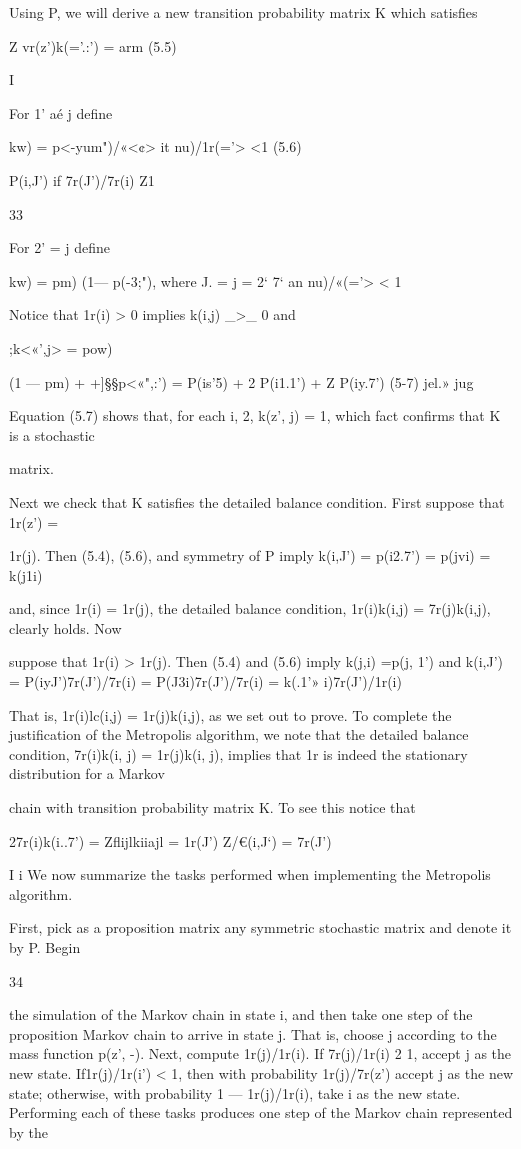 Using P, we will derive a new transition probability matrix K which satisﬁes

Z vr(z')k(='.:') = arm (5.5)

I

For 1' aé j deﬁne

kw) = p<-yum")/«<¢> it nu)/1r(='> <1 (5.6)

P(i,J') if 7r(J')/7r(i) Z1

33

For 2' = j deﬁne

kw) = pm) (1—  p(-3;"), where J. = {j = 2‘ 7‘ an nu)/«(='> < 1}

Notice that 1r(i) > 0 implies k(i,j) _>_ 0 and

;k<«',j> = pow)  { (1 —  pm) +  +]§§p<«",:')
= P(is'5) + 2 P(i1.1') + Z P(iy.7') (5-7)
jel.» jug

Equation (5.7) shows that, for each i, 2, k(z', j) = 1, which fact conﬁrms that K is a stochastic

matrix.

Next we check that K satisﬁes the detailed balance condition. First suppose that 1r(z') =

1r(j). Then (5.4), (5.6), and symmetry of P imply
k(i,J') = p(i2.7') = p(jvi) = k(j1i)

and, since 1r(i) = 1r(j), the detailed balance condition, 1r(i)k(i,j) = 7r(j)k(i,j), clearly holds. Now

suppose that 1r(i) > 1r(j). Then (5.4) and (5.6) imply k(j,i) =p(j, 1') and
k(i,J') = P(iyJ')7r(J')/7r(i) = P(J3i)7r(J')/7r(i) = k(.1'» i)7r(J')/1r(i)

That is, 1r(i)lc(i,j) = 1r(j)k(i,j), as we set out to prove.
To complete the justification of the Metropolis algorithm, we note that the detailed balance
condition, 7r(i)k(i, j) = 1r(j)k(i, j), implies that 1r is indeed the stationary distribution for a Markov

chain with transition probability matrix K. To see this notice that

27r(i)k(i..7') = Zﬂijlkiiajl = 1r(J') Z/€(i,J‘) = 7r(J')

I i
We now summarize the tasks performed when implementing the Metropolis algorithm.

First, pick as a proposition matrix any symmetric stochastic matrix and denote it by P. Begin

34

the simulation of the Markov chain in state i, and then take one step of the proposition Markov
chain to arrive in state j. That is, choose j according to the mass function p(z', -). Next, compute
1r(j)/1r(i). If 7r(j)/1r(i) 2 1, accept j as the new state. If1r(j)/1r(i') < 1, then with probability
1r(j)/7r(z') accept j as the new state; otherwise, with probability 1 — 1r(j)/1r(i), take i as the new
state. Performing each of these tasks produces one step of the Markov chain represented by the

}
